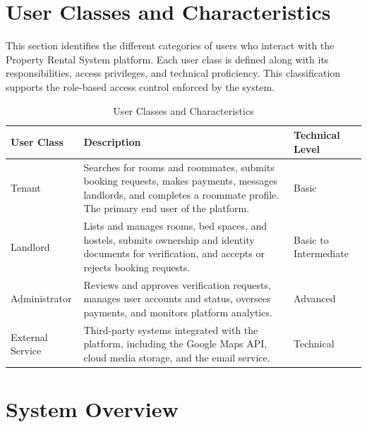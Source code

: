 \section{User Classes and Characteristics}

This section identifies the different categories of users who interact with the Property Rental System platform. Each user class is defined along with its responsibilities, access privileges, and technical proficiency. This classification supports the role-based access control enforced by the system.

\begin{table}[h]
\centering
\caption{User Classes and Characteristics}

\begin{tabularx}{\textwidth}{|>{\raggedright\arraybackslash}p{3cm}|X|>{\raggedright\arraybackslash}p{2.5cm}|}
\hline
\textbf{User Class} & \textbf{Description} & \textbf{Technical Level} \\
\hline
Tenant & Searches for rooms and roommates, submits booking requests, makes payments, messages landlords, and completes a roommate profile. The primary end user of the platform. & Basic \\
\hline
Landlord & Lists and manages rooms, bed spaces, and hostels, submits ownership and identity documents for verification, and accepts or rejects booking requests. & Basic to Intermediate \\
\hline
Administrator & Reviews and approves verification requests, manages user accounts and status, oversees payments, and monitors platform analytics. & Advanced \\
\hline
External Service & Third-party systems integrated with the platform, including the Google Maps API, cloud media storage, and the email service. & Technical \\
\hline
\end{tabularx}

\end{table}

\section{System Overview}

